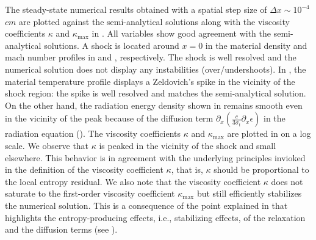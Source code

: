\documentclass[times,doublespace]{fldauth}%
\begin{document}
The steady-state numerical results obtained with a spatial step size of $\Delta x \sim 10^{-4}$ $cm$ are plotted against the semi-analytical solutions %
along with the viscosity coefficients $\kappa$ and $\kappa_\text{max}$ in . All variables show good agreement with the semi-analytical solutions. A shock is located around $x=0$ in the material density and mach number profiles in  and , respectively. The shock is well resolved and the numerical solution does not display any instabilities (over/undershoots). In , the material temperature profile displays a Zeldovich's spike in the vicinity of the shock region: the spike is well resolved and matches the semi-analytical solution. On the other hand, the radiation energy density shown in  remains smooth even in the vicinity of the peak because of the diffusion term $ \partial_x \left( \frac{c}{3 \sigma_t} \partial_x \epsilon \right)$ in the radiation equation (). The viscosity coefficients $\kappa$ and $\kappa_\text{max}$ are plotted in  on a log scale. We observe that $\kappa$ is peaked in the vicinity of the shock and small elsewhere. This behavior is in agreement with the underlying principles invioked in the definition of the viscosity coefficient $\kappa$, that is, $\kappa$
should be proportional to the local entropy residual. We also note that the viscosity coefficient $\kappa$ does not saturate to the first-order viscosity coefficient $\kappa_\text{max}$ but still efficiently stabilizes the numerical solution. This is a consequence of the point explained in  that highlights the entropy-producing effects, i.e., stabilizing effects, of the relaxation and the diffusion terms (see ).
\end{document}
